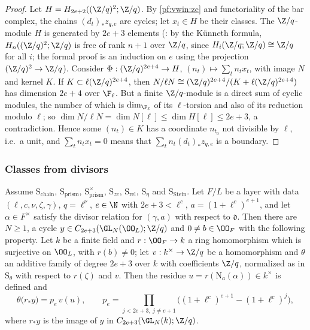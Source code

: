 \begin{proof}
Let $H=H_{2e+2}((\Z/q)^2;\Z/q)$. By \cref{pf:vwin:zc} and functoriality of the bar complex, the chains $(d_t)_*z_{q,e}$ are
cycles; let $x_t\in H$ be their classes. The $\Z/q$-module $H$ is generated by $2e+3$ elements
(: by the K\"unneth formula, $H_n((\Z/q)^2;\Z/q)$ is free of rank $n+1$ over $\Z/q$, since
$H_i(\Z/q;\Z/q)\cong\Z/q$ for all $i$; the formal proof is an induction on $e$ using the projection $(\Z/q)^2\to\Z/q$).
Consider $\Phi:(\Z/q)^{2e+4}\to H$, $(n_t)\mapsto\sum_tn_tx_t$, with image $N$ and kernel $K$. If $K\subset\ell(\Z/q)^{2e+4}$,
then $N/\ell N\cong(\Z/q)^{2e+4}/(K+\ell(\Z/q)^{2e+4})$ has dimension $2e+4$ over $\F_\ell$. But a finite $\Z/q$-module is a direct
sum of cyclic modules, the number of which is $\dim_{\F_\ell}$ of its $\ell$-torsion and also of its reduction modulo $\ell$; so
$\dim N/\ell N=\dim N[\ell]\le\dim H[\ell]\le2e+3$, a contradiction. Hence some $(n_t)\in K$ has a coordinate $n_{t_0}$ not
divisible by $\ell$, i.e.\ a unit, and $\sum_tn_tx_t=0$ means that $\sum_tn_t(d_t)_*z_{q,e}$ is a boundary.
\end{proof}

\subsubsection{Classes from divisors}

\begin{proposition}\label{pf:vwin:sclass}
Assume $\mathrm S_{\mathrm{chain}}$, $\mathrm S_{\mathrm{prism}}$, $\mathrm S_{\mathrm{prism}}^\times$, $\mathrm S_{zc}$,
$\mathrm S_{\mathrm{rel}}$, $\mathrm S_\eta$ and $\mathrm S_{\mathrm{Stein}}$. Let $F/L$ be a layer with data
$(\ell,c,\nu,\zeta,\gamma)$, $q=\ell^\nu$, $e\in\N$ with $2e+3<\ell^c$, $a=(1+\ell^c)^{e+1}$, and let $\alpha\in F^\times$ satisfy the
divisor relation for $(\gamma,a)$ with respect to $\mathfrak d$. Then there are $N\ge1$, a cycle $y\in C_{2e+3}(\GL_N(\OO_L);\Z/q)$
and $0\ne b\in\OO_F$ with the following property. Let $k$ be a finite field and $r:\OO_F\to k$ a ring homomorphism which is
surjective on $\OO_L$, with $r(b)\ne0$; let $v:k^\times\to\Z/q$ be a homomorphism and $\theta$ an additive family of degree
$2e+3$ over $k$ with coefficients $\Z/q$, normalized as in $\mathrm S_\theta$ with respect to $r(\zeta)$ and $v$. Then the
residue $u=r(\mathrm N_a(\alpha))\in k^\times$ is defined and
\[
 \theta\bigl(r_*y\bigr)=p_e\,v(u),\qquad p_e=\prod_{j<2e+3,\ j\ne e+1}\bigl((1+\ell^c)^{e+1}-(1+\ell^c)^j\bigr),
\]
where $r_*y$ is the image of $y$ in $C_{2e+3}(\GL_N(k);\Z/q)$.
\end{proposition}

